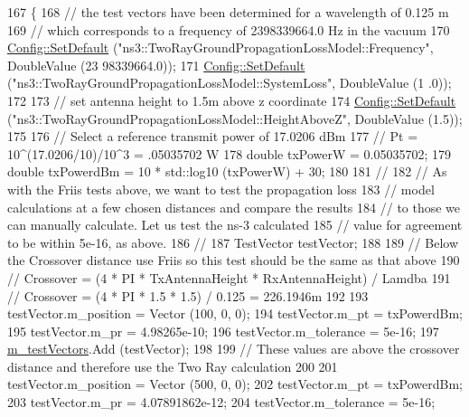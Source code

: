 \begin{DoxyCode}
167 \{
168   \textcolor{comment}{// the test vectors have been determined for a wavelength of 0.125 m }
169   \textcolor{comment}{// which corresponds to a frequency of 2398339664.0 Hz in the vacuum}
170   \hyperlink{group__config_ga2e7882df849d8ba4aaad31c934c40c06}{Config::SetDefault} (\textcolor{stringliteral}{"ns3::TwoRayGroundPropagationLossModel::Frequency"}, DoubleValue (23
      98339664.0));
171   \hyperlink{group__config_ga2e7882df849d8ba4aaad31c934c40c06}{Config::SetDefault} (\textcolor{stringliteral}{"ns3::TwoRayGroundPropagationLossModel::SystemLoss"}, DoubleValue (1
      .0));
172 
173   \textcolor{comment}{// set antenna height to 1.5m above z coordinate}
174   \hyperlink{group__config_ga2e7882df849d8ba4aaad31c934c40c06}{Config::SetDefault} (\textcolor{stringliteral}{"ns3::TwoRayGroundPropagationLossModel::HeightAboveZ"}, DoubleValue 
      (1.5));
175 
176   \textcolor{comment}{// Select a reference transmit power of 17.0206 dBm}
177   \textcolor{comment}{// Pt = 10^(17.0206/10)/10^3 = .05035702 W}
178   \textcolor{keywordtype}{double} txPowerW = 0.05035702;
179   \textcolor{keywordtype}{double} txPowerdBm = 10 * std::log10 (txPowerW) + 30;
180 
181   \textcolor{comment}{//}
182   \textcolor{comment}{// As with the Friis tests above, we want to test the propagation loss }
183   \textcolor{comment}{// model calculations at a few chosen distances and compare the results }
184   \textcolor{comment}{// to those we can manually calculate. Let us test the ns-3 calculated }
185   \textcolor{comment}{// value for agreement to be within 5e-16, as above.}
186   \textcolor{comment}{//}
187   TestVector testVector;
188 
189   \textcolor{comment}{// Below the Crossover distance use Friis so this test should be the same as that above}
190   \textcolor{comment}{// Crossover = (4 * PI * TxAntennaHeight * RxAntennaHeight) / Lamdba}
191   \textcolor{comment}{// Crossover = (4 * PI * 1.5 * 1.5) / 0.125 = 226.1946m}
192 
193   testVector.m\_position = Vector (100, 0, 0);
194   testVector.m\_pt = txPowerdBm;
195   testVector.m\_pr = 4.98265e-10;
196   testVector.m\_tolerance = 5e-16;
197   \hyperlink{classTwoRayGroundPropagationLossModelTestCase_ab0bd335163cae1eb85b9947c853e28a5}{m\_testVectors}.Add (testVector);
198 
199   \textcolor{comment}{// These values are above the crossover distance and therefore use the Two Ray calculation}
200 
201   testVector.m\_position = Vector (500, 0, 0);
202   testVector.m\_pt = txPowerdBm;
203   testVector.m\_pr = 4.07891862e-12;
204   testVector.m\_tolerance = 5e-16;

\end{DoxyCode}
